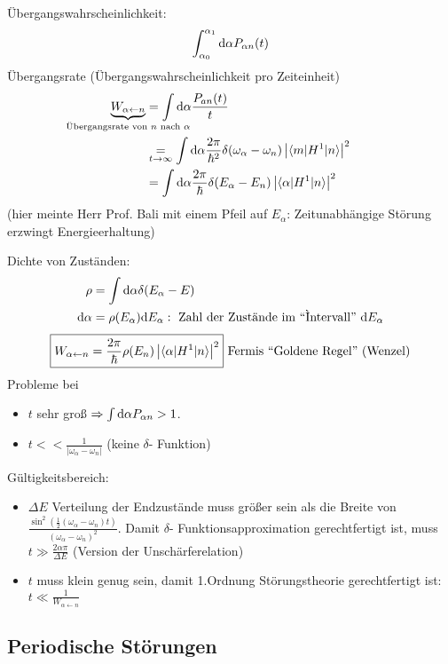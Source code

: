 	Übergangswahrscheinlichkeit: 
		\begin{equation*}
			\int_{\alpha_0}^{\alpha_1} \mathrm{d} \alpha P_{\alpha n} (t)
		\end{equation*}
	Übergangsrate (Übergangswahrscheinlichkeit pro Zeiteinheit)
		\begin{align*}
			\underbrace{W_{\alpha \leftarrow n}}_{
				\mathclap{\text{Übergangsrate von~} n \text{~nach~} \alpha}}
			&= \int \diff \alpha \frac{P_{an}(t)}{t} \\
			&\underset{t \rightarrow \infty}{=} 
			\int \diff \alpha \frac{2 \pi}{\hbar^2} 
			\delta(\omega_\alpha - \omega_n) \left| \braket{m | H^1 | n}\right|^2 \\
			&= \int \diff \alpha \frac{2 \pi}{\hbar} 
			\delta (E_\alpha - E_n) \left| \braket{\alpha | H^1 | n}\right|^2
		\end{align*}
	(hier meinte Herr Prof. Bali mit einem Pfeil auf $E_\alpha$: Zeitunabhängige Störung erzwingt Energieerhaltung)
	
	Dichte von Zuständen:
		\begin{align*}
			\rho &= \int \mathrm{d} \alpha \delta (E_\alpha - E)  \\
			\mathrm{d} \alpha &= \rho(E_\alpha) \mathrm{d} E_\alpha: \text{~Zahl der Zustände im ``Ìntervall''~} \mathrm{d} E_\alpha
		\end{align*}
		\begin{align*}
			\boxed{
				W_{\alpha \leftarrow n} = \frac{2 \pi}{\hbar} \rho(E_n)
					\left| \braket{\alpha | H^1 | n}\right|^2
				}
			\text{~Fermis ``Goldene Regel'' (Wenzel)}
		\end{align*}
	Probleme bei 
		\begin{itemize}
			\item $t$ sehr groß $\Rightarrow \int \mathrm{d} \alpha P_{\alpha n} > 1$.
			\item $t  << \frac{1}{|\omega_\alpha - \omega_n|}$ (keine $\delta$- Funktion)   
		\end{itemize}	
	Gültigkeitsbereich:
		\begin{itemize}
			\item $\Delta E$ Verteilung der Endzustände muss größer sein als die Breite von $\frac{\sin^2 (\frac{1}{2}(\omega_\alpha - \omega_n) t)}{(\omega_\alpha - \omega_n)^2}$. Damit $\delta$- Funktionsapproximation gerechtfertigt ist, muss $t \gg \frac{2 \alpha \pi}{\Delta E}$ (Version der Unschärferelation)
			\item $t$ muss klein genug sein, damit 1.Ordnung Störungstheorie gerechtfertigt ist:
			\\ $t \ll \frac{1}{W_{\alpha \leftarrow n}}$
		\end{itemize}
		
\subsection{Periodische Störungen}